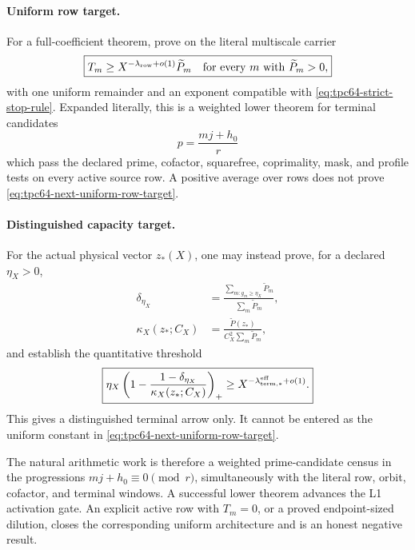 \paragraph{Uniform row target.}
For a full-coefficient theorem, prove on the literal multiscale carrier
\begin{equation}
 \boxed{
 T_m
 \ge X^{-\lambda_{\rm row}+o(1)}\widetilde P_m
 \quad\text{for every }m\text{ with }\widetilde P_m>0,}
 \label{eq:tpc64-next-uniform-row-target}
\end{equation}
with one uniform remainder and an exponent compatible with
\eqref{eq:tpc64-strict-stop-rule}.  Expanded literally, this is a weighted
lower theorem for terminal candidates
\begin{equation}
 p=\frac{mj+h_0}{r}
 \label{eq:tpc64-next-prime-candidate}
\end{equation}
which pass the declared prime, cofactor, squarefree, coprimality, mask, and
profile tests on every active source row.  A positive average over rows
does not prove \eqref{eq:tpc64-next-uniform-row-target}.

\paragraph{Distinguished capacity target.}
For the actual physical vector \(z_*(X)\), one may instead prove, for a
declared \(\eta_X>0\),
\begin{align}
 \delta_{\eta_X}
 &=
 \frac{\sum_{m:g_m\ge\eta_X}\widetilde P_m}
      {\sum_m\widetilde P_m},
 \label{eq:tpc64-next-delta-target}\\
 \kappa_X(z_*;C_X)
 &=
 \frac{\widetilde P(z_*)}
      {C_X^2\sum_m\widetilde P_m},
 \label{eq:tpc64-next-kappa-target}
\end{align}
and establish the quantitative threshold
\begin{equation}
 \boxed{
 \eta_X
 \left(
 1-\frac{1-\delta_{\eta_X}}
          {\kappa_X(z_*;C_X)}
 \right)_+
 \ge X^{-\lambda_{\rm term,*}^{\rm eff}+o(1)}.}
 \label{eq:tpc64-next-distinguished-capacity-target}
\end{equation}
This gives a distinguished terminal arrow only.  It cannot be entered as
the uniform constant in
\eqref{eq:tpc64-next-uniform-row-target}.

The natural arithmetic work is therefore a weighted prime-candidate
census in the progressions
\(mj+h_0\equiv0\pmod r\), simultaneously with the literal row, orbit,
cofactor, and terminal windows.  A successful lower theorem advances the
L1 activation gate.  An explicit active row with \(T_m=0\), or a proved
endpoint-sized dilution, closes the corresponding uniform architecture
and is an honest negative result.

